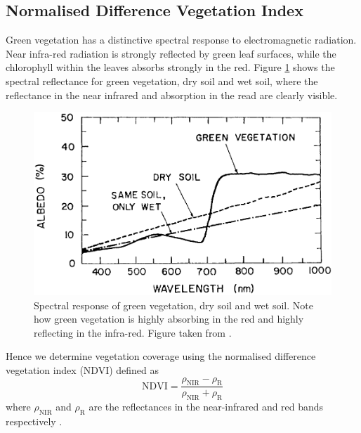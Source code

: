 \subsection{Normalised Difference Vegetation Index}
\label{sec:intro:ndvi}
Green vegetation has a distinctive spectral response to electromagnetic
radiation. Near infra-red radiation is strongly reflected by green leaf
surfaces, while the chlorophyll within the leaves absorbs strongly in the
red. Figure \ref{fig:leaf_spec} shows the spectral reflectance for green vegetation, dry soil and wet soil, where the reflectance in the near infrared and absorption in the read are clearly visible.
\begin{figure}
  \centering
  \includegraphics[width=0.9\linewidth]{figures/leaf_spec}
  \caption{Spectral response of green vegetation, dry soil and wet soil. Note how green vegetation is highly absorbing in the red and highly reflecting in the infra-red. Figure taken from \cite{tucker1977}.}
  \label{fig:leaf_spec}
\end{figure}
Hence we determine vegetation coverage using the normalised difference
vegetation index (NDVI) defined as
\begin{equation}
  \mathrm{NDVI} = \frac{\rho_{\mathrm{NIR}}-\rho_{\mathrm{R}}}{\rho_{\mathrm{NIR}}+\rho_{\mathrm{R}}}
  \label{eq:ndvi}
\end{equation}
where $\rho_{\mathrm{NIR}}$ and $\rho_{\mathrm{R}}$ are the reflectances in the
near-infrared and red bands respectively \citep{tucker1979}.

